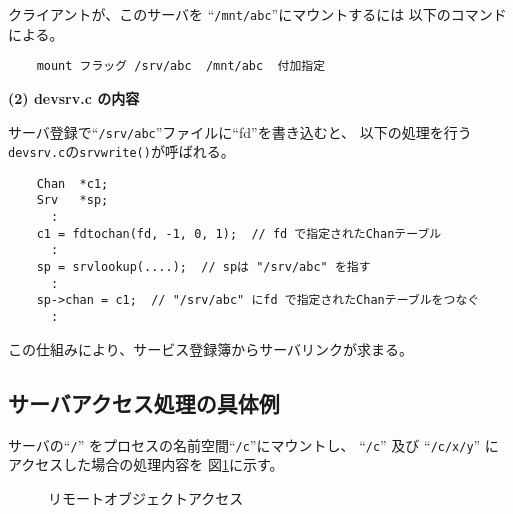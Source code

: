 クライアントが、このサーバを ``{\tt /mnt/abc}''にマウントするには
以下のコマンドによる。
\begin{verbatim}
    mount フラッグ /srv/abc  /mnt/abc  付加指定
\end{verbatim}



{\bf\flushleft (2) devsrv.c の内容}

サーバ登録で``{\tt /srv/abc}''ファイルに``fd''を書き込むと、
以下の処理を行う{\tt devsrv.c}の{\tt srvwrite()}が呼ばれる。

\begin{verbatim}
    Chan  *c1;
    Srv   *sp;
      :
    c1 = fdtochan(fd, -1, 0, 1);  // fd で指定されたChanテーブル
      :
    sp = srvlookup(....);  // spは "/srv/abc" を指す
      :
    sp->chan = c1;  // "/srv/abc" にfd で指定されたChanテーブルをつなぐ
      :
\end{verbatim}

この仕組みにより、サービス登録簿からサーバリンクが求まる。


\subsection{サーバアクセス処理の具体例}

 サーバの``{\tt /}'' をプロセスの名前空間``{\tt /c}''にマウントし、
``{\tt /c}'' 及び ``{\tt /c/x/y}''  にアクセスした場合の処理内容を
図\ref{fig:RemoteAccess}に示す。

\begin{figure}[tb]
  \begin{center}
   \epsfxsize=340pt
    \caption{リモートオブジェクトアクセス}
    \label{fig:RemoteAccess}
  \end{center}
\end{figure}


